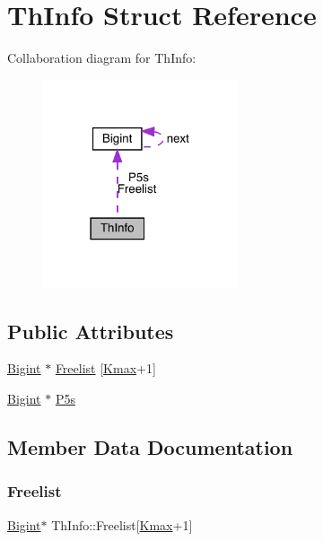 \hypertarget{struct_th_info}{}\section{Th\+Info Struct Reference}
\label{struct_th_info}


Collaboration diagram for Th\+Info\+:\nopagebreak
\begin{figure}[H]
\begin{center}
\leavevmode
\includegraphics[width=162pt]{struct_th_info__coll__graph}
\end{center}
\end{figure}
\subsection*{Public Attributes}
\begin{DoxyCompactItemize}
\item 
\hyperlink{struct_bigint}{Bigint} $\ast$ \hyperlink{struct_th_info_aa01cbd438821e9e091020ebbf1ecd210}{Freelist} \mbox{[}\hyperlink{dtoa_8c_a60a2b72a9437564147596c3308b55845}{Kmax}+1\mbox{]}
\item 
\hyperlink{struct_bigint}{Bigint} $\ast$ \hyperlink{struct_th_info_a0c079d4c3cf2296a7d6b7b2a1d80d841}{P5s}
\end{DoxyCompactItemize}


\subsection{Member Data Documentation}
\mbox{\label{struct_th_info_aa01cbd438821e9e091020ebbf1ecd210}} 
\subsubsection{\texorpdfstring{Freelist}{Freelist}}
{\footnotesize\ttfamily \hyperlink{struct_bigint}{Bigint}$\ast$ Th\+Info\+::\+Freelist\mbox{[}\hyperlink{dtoa_8c_a60a2b72a9437564147596c3308b55845}{Kmax}+1\mbox{]}}

